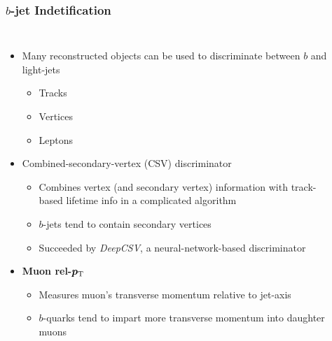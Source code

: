 \begin{frame}
  \frametitle{\textbf{$b$-jet Indetification}}
  \begin{columns}
    \begin{itemize}
    \item Many reconstructed objects can be used to discriminate between $b$ and light-jets
      \begin{itemize}
      \item Tracks
      \item Vertices
      \item Leptons
      \end{itemize}
    \item Combined-secondary-vertex (CSV) discriminator
      \begin{itemize}
      \item Combines vertex (and secondary vertex) information with track-based lifetime info in a complicated algorithm
      \item $b$-jets tend to contain secondary vertices
      \item Succeeded by \textit{DeepCSV}, a neural-network-based discriminator
      \end{itemize}
    \item \textbf{Muon rel-}$\boldmath{p_{\text{T}}}$
      \begin{itemize}
      \item Measures muon's transverse momentum relative to jet-axis
      \item $b$-quarks tend to impart more transverse momentum into daughter muons
      \end{itemize}
    \end{itemize}
    \centering

    \
    
  \end{columns}
\end{frame}
